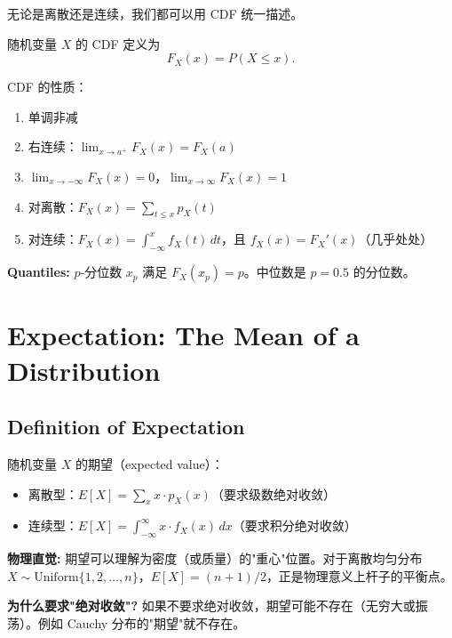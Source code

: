 无论是离散还是连续，我们都可以用 CDF 统一描述。

\begin{Definition}[累积分布函数]\label{def:cdf}
随机变量 $X$ 的 CDF 定义为
\[
F_X(x) = P(X \leq x).
\]
\end{Definition}

CDF 的性质：
\begin{enumerate}
    \item 单调非减
    \item 右连续：$\lim_{x \to a^+} F_X(x) = F_X(a)$
    \item $\lim_{x \to -\infty} F_X(x) = 0$，$\lim_{x \to \infty} F_X(x) = 1$
    \item 对离散：$F_X(x) = \sum_{t \leq x} p_X(t)$
    \item 对连续：$F_X(x) = \int_{-\infty}^x f_X(t) \, dt$，且 $f_X(x) = F_X'(x)$（几乎处处）
\end{enumerate}

\textbf{Quantiles:} $p$-分位数 $x_p$ 满足 $F_X(x_p) = p$。中位数是 $p = 0.5$ 的分位数。

\section{Expectation: The Mean of a Distribution}\label{sec:expectation}

\subsection{Definition of Expectation}\label{sub:expectation-def}

\begin{Definition}[数学期望]\label{def:expectation}
随机变量 $X$ 的期望（expected value）：
\begin{itemize}
    \item 离散型：$E[X] = \sum_{x} x \cdot p_X(x)$（要求级数绝对收敛）
    \item 连续型：$E[X] = \int_{-\infty}^{\infty} x \cdot f_X(x) \, dx$（要求积分绝对收敛）
\end{itemize}
\end{Definition}

\textbf{物理直觉:} 期望可以理解为密度（或质量）的"重心"位置。对于离散均匀分布 $X \sim \text{Uniform}\{1, 2, \ldots, n\}$，$E[X] = (n+1)/2$，正是物理意义上杆子的平衡点。

\bigskip

\textbf{为什么要求"绝对收敛"?} 如果不要求绝对收敛，期望可能不存在（无穷大或振荡）。例如 Cauchy 分布的"期望"就不存在。

